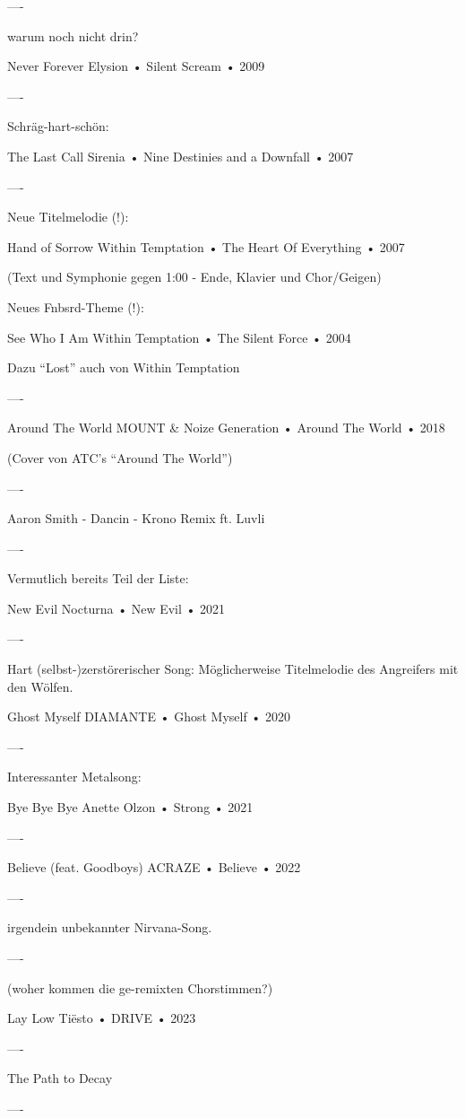  ----

warum noch nicht drin?

Never Forever
Elysion
 •
Silent Scream
 • 2009

----

Schräg-hart-schön:

The Last Call
Sirenia
 •
Nine Destinies and a Downfall
 • 2007

----

Neue Titelmelodie (!):

Hand of Sorrow
Within Temptation
 •
The Heart Of Everything
 • 2007

(Text und Symphonie gegen 1:00 - Ende, Klavier und Chor/Geigen)

Neues Fnbsrd-Theme (!):

See Who I Am
Within Temptation
 •
The Silent Force
 • 2004

Dazu “Lost” auch von Within Temptation

----

Around The World
MOUNT
 &
Noize Generation
 •
Around The World
 •
2018


(Cover von ATC’s “Around The World”)

----

Aaron Smith - Dancin - Krono Remix ft. Luvli

----

Vermutlich bereits Teil der Liste:

New Evil
Nocturna
 •
New Evil
 •
2021

----

Hart (selbst-)zerstörerischer Song: Möglicherweise Titelmelodie des Angreifers mit den Wölfen.

Ghost Myself
DIAMANTE
 •
Ghost Myself
 •
2020

----

Interessanter Metalsong:

Bye Bye Bye
Anette Olzon
 •
Strong
 •
2021

----

Believe (feat. Goodboys)
ACRAZE
•
Believe
• 2022

----

irgendein unbekannter Nirvana-Song.

----

(woher kommen die ge-remixten Chorstimmen?)

Lay Low
Tiësto
 •
DRIVE
 •
2023

----

The Path to Decay

----

